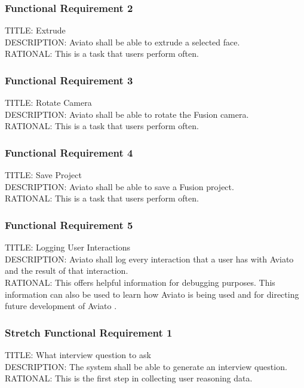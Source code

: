 \documentclass[onecolumn, draftclsnofoot,10pt, compsoc]{IEEEtran}
\def \botname{Aviato }
\begin{document}
        \subsubsection{Functional Requirement 2}
        TITLE: Extrude \\
        DESCRIPTION: \botname shall be able to extrude a selected face. \\
        RATIONAL: This is a task that users perform often.
        
        \subsubsection{Functional Requirement 3}
        TITLE: Rotate Camera \\
        DESCRIPTION: \botname shall be able to rotate the Fusion camera. \\
        RATIONAL: This is a task that users perform often.
        
        \subsubsection{Functional Requirement 4}
        TITLE: Save Project \\
        DESCRIPTION: \botname shall be able to save a Fusion project. \\
        RATIONAL: This is a task that users perform often.
        
        \subsubsection{Functional Requirement 5}
        TITLE: Logging User Interactions \\
        DESCRIPTION: \botname shall log every interaction that a user has with \botname and the result of that interaction. \\
        RATIONAL: This offers helpful information for debugging purposes. This information can also be used to learn how \botname is being used and for directing future development of \botname.
        
        
        \subsubsection{Stretch Functional Requirement 1}
        TITLE: What interview question to ask \\
        DESCRIPTION: The system shall be able to generate an interview question. \\
        RATIONAL: This is the first step in collecting user reasoning data.  
        
\end{document}
